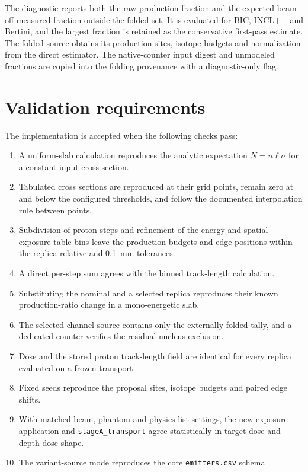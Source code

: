 \documentclass[11pt]{article}
\newcommand{\file}[1]{\texttt{#1}}
\begin{document}
The diagnostic reports both the raw-production fraction and the expected
beam-off measured fraction outside the folded set.  It is evaluated for BIC,
INCL++ and Bertini, and the largest fraction is retained as the conservative
first-pass estimate.  The folded source obtains its production sites, isotope
budgets and normalization from the direct estimator.  The native-counter input
digest and unmodeled fractions are copied into the folding provenance with a
diagnostic-only flag.

\section{Validation requirements}

The implementation is accepted when the following checks pass:
\begin{enumerate}
  \item A uniform-slab calculation reproduces the analytic expectation
        $N=n\ell\sigma$ for a constant input cross section.
  \item Tabulated cross sections are reproduced at their grid points, remain
        zero at and below the configured thresholds, and follow the documented
        interpolation rule between points.
  \item Subdivision of proton steps and refinement of the energy and spatial
        exposure-table bins leave the production budgets and edge positions
        within the replica-relative and \SI{0.1}{mm} tolerances.
  \item A direct per-step sum agrees with the binned track-length calculation.
  \item Substituting the nominal and a selected replica reproduces their known
        production-ratio change in a mono-energetic slab.
  \item The selected-channel source contains only the externally folded tally,
        and a dedicated counter verifies the residual-nucleus exclusion.
  \item Dose and the stored proton track-length field are identical for every
        replica evaluated on a frozen transport.
  \item Fixed seeds reproduce the proposal sites, isotope budgets and paired
        edge shifts.
  \item With matched beam, phantom and physics-list settings, the new exposure
        application and \file{stageA\_transport} agree statistically in target
        dose and depth-dose shape.
  \item The variant-source mode reproduces the core \file{emitters.csv} schema

\end{enumerate}
\end{document}
